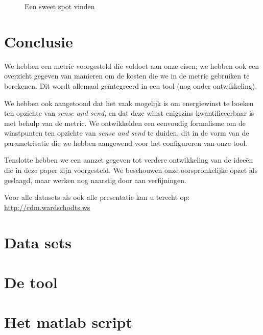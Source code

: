 \documentclass[11pt]{article}
\begin{document}
\begin{figure}[h]
\centering
\missingfigure{}
\caption{Een sweet spot vinden}
\label{fig:sweet_spot}
\end{figure}

\section{Conclusie}

We hebben een metric voorgesteld die voldoet aan onze eisen; we hebben ook een
overzicht gegeven van manieren om de kosten die we in de metric gebruiken te
berekenen. Dit wordt allemaal ge\"integreerd in een tool (nog onder
ontwikkeling).

We hebben ook aangetoond dat het vaak mogelijk is om energiewinst te boeken ten
opzichte van \textit{sense and send}, en dat deze winst enigszins
kwantificeerbaar is met behulp van de metric. We ontwikkelden een eenvoudig
formalisme om de winstpunten ten opzichte van \textit{sense and send} te duiden,
dit in de vorm van de parametrisatie die we hebben aangewend voor het
configureren van onze tool.

Tenslotte hebben we een aanzet gegeven tot verdere ontwikkeling van de idee\"en
die in deze paper zijn voorgesteld. We beschouwen onze oorspronkelijke opzet als
geslaagd, maar werken nog naarstig door aan verfijningen.


\nocite{*}

Voor alle datasets als ook alle presentatie kan u terecht op: \url{http://cdm.wardschodts.ws}
\newpage
\appendix
\section{Data sets}
\section{De tool}
\section{Het matlab script}
\end{document}
